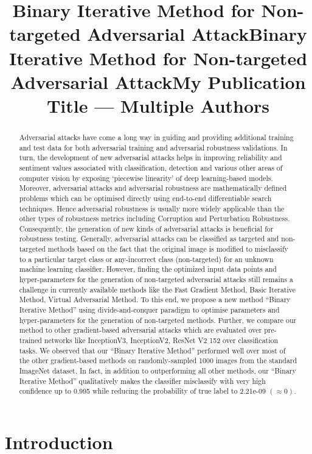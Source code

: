 \documentclass[letterpaper]{article} %
\title{Binary Iterative Method for Non-targeted Adversarial Attack}
\author{

}
\title{Binary Iterative Method for Non-targeted Adversarial Attack}
\author {
}
\title{My Publication Title --- Multiple Authors}
\author {

}
\begin{document}
\linenumbers
\maketitle

\begin{abstract}
Adversarial attacks have come a long way in guiding and providing additional training and test data for both adversarial training and adversarial robustness validations. In turn, the development of new adversarial attacks helps in improving reliability and sentiment values associated with classification, detection and various other areas of computer vision by exposing ‘piecewise linearity’ of deep learning-based models. Moreover, adversarial attacks and adversarial robustness are mathematically defined problems which can be optimised directly using end-to-end differentiable search techniques. Hence adversarial robustness is usually more widely applicable than the other types of robustness metrics including Corruption and Perturbation Robustness. Consequently, the generation of new kinds of adversarial attacks is beneficial for robustness testing. Generally, adversarial attacks can be classified as targeted and non-targeted methods based on the fact that the original image is modified to misclassify to a particular target class or any-incorrect class (non-targeted) for an unknown machine learning classifier. However, finding the optimized input data points and hyper-parameters for the generation of non-targeted adversarial attacks still remains a challenge in currently available methods like the Fast Gradient Method, Basic Iterative Method, Virtual Adversarial Method. To this end, we propose a new method “Binary Iterative Method” using divide-and-conquer paradigm to optimise parameters and hyper-parameters for the generation of non-targeted methods. Further, we compare our method to other gradient-based adversarial attacks which are evaluated over pre-trained networks like InceptionV3, InceptionV2, ResNet V2 152 over classification tasks. We observed that our “Binary Iterative Method” performed well over most of the other gradient-based methods on randomly-sampled 1000 images from the standard ImageNet dataset. In fact, in addition to outperforming all other methods,  our “Binary Iterative Method” qualitatively makes the classifier misclassify with very high confidence up to 0.995 while reducing the probability of true label to 2.21e-09 $(\approx 0)$.
\end{abstract}


\section{Introduction}
\end{document}
